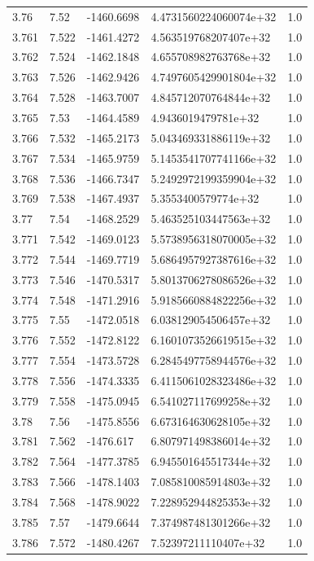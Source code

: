 \begin{tabular}{lllll}
3.76 & 7.52 & -1460.6698 & 4.4731560224060074e+32 & 1.0 \\
3.761 & 7.522 & -1461.4272 & 4.563519768207407e+32 & 1.0 \\
3.762 & 7.524 & -1462.1848 & 4.655708982763768e+32 & 1.0 \\
3.763 & 7.526 & -1462.9426 & 4.7497605429901804e+32 & 1.0 \\
3.764 & 7.528 & -1463.7007 & 4.845712070764844e+32 & 1.0 \\
3.765 & 7.53 & -1464.4589 & 4.9436019479781e+32 & 1.0 \\
3.766 & 7.532 & -1465.2173 & 5.043469331886119e+32 & 1.0 \\
3.767 & 7.534 & -1465.9759 & 5.1453541707741166e+32 & 1.0 \\
3.768 & 7.536 & -1466.7347 & 5.2492972199359904e+32 & 1.0 \\
3.769 & 7.538 & -1467.4937 & 5.3553400579774e+32 & 1.0 \\
3.77 & 7.54 & -1468.2529 & 5.463525103447563e+32 & 1.0 \\
3.771 & 7.542 & -1469.0123 & 5.5738956318070005e+32 & 1.0 \\
3.772 & 7.544 & -1469.7719 & 5.6864957927387616e+32 & 1.0 \\
3.773 & 7.546 & -1470.5317 & 5.8013706278086526e+32 & 1.0 \\
3.774 & 7.548 & -1471.2916 & 5.9185660884822256e+32 & 1.0 \\
3.775 & 7.55 & -1472.0518 & 6.038129054506457e+32 & 1.0 \\
3.776 & 7.552 & -1472.8122 & 6.1601073526619515e+32 & 1.0 \\
3.777 & 7.554 & -1473.5728 & 6.2845497758944576e+32 & 1.0 \\
3.778 & 7.556 & -1474.3335 & 6.4115061028323486e+32 & 1.0 \\
3.779 & 7.558 & -1475.0945 & 6.541027117699258e+32 & 1.0 \\
3.78 & 7.56 & -1475.8556 & 6.673164630628105e+32 & 1.0 \\
3.781 & 7.562 & -1476.617 & 6.807971498386014e+32 & 1.0 \\
3.782 & 7.564 & -1477.3785 & 6.945501645517344e+32 & 1.0 \\
3.783 & 7.566 & -1478.1403 & 7.085810085914803e+32 & 1.0 \\
3.784 & 7.568 & -1478.9022 & 7.228952944825353e+32 & 1.0 \\
3.785 & 7.57 & -1479.6644 & 7.374987481301266e+32 & 1.0 \\
3.786 & 7.572 & -1480.4267 & 7.52397211110407e+32 & 1.0 \\

\end{tabular}
